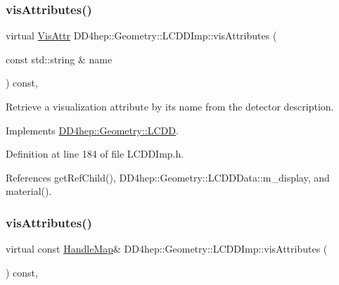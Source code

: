 \subsubsection{\texorpdfstring{vis\+Attributes()}{visAttributes()}\hspace{0.1cm}{\footnotesize\ttfamily [1/2]}}
{\footnotesize\ttfamily virtual \hyperlink{class_d_d4hep_1_1_geometry_1_1_vis_attr}{Vis\+Attr} D\+D4hep\+::\+Geometry\+::\+L\+C\+D\+D\+Imp\+::vis\+Attributes (\begin{DoxyParamCaption}\item[{const std\+::string \&}]{name }\end{DoxyParamCaption}) const\hspace{0.3cm}{\ttfamily [inline]}, {\ttfamily [virtual]}}



Retrieve a visualization attribute by it\textquotesingle{}s name from the detector description. 



Implements \hyperlink{class_d_d4hep_1_1_geometry_1_1_l_c_d_d_a449330acbb5a5d6ba6f1fa2d97cea338}{D\+D4hep\+::\+Geometry\+::\+L\+C\+DD}.



Definition at line 184 of file L\+C\+D\+D\+Imp.\+h.



References get\+Ref\+Child(), D\+D4hep\+::\+Geometry\+::\+L\+C\+D\+D\+Data\+::m\+\_\+display, and material().

\hypertarget{class_d_d4hep_1_1_geometry_1_1_l_c_d_d_imp_a7df9209e12c5e72b432351ee9c9dfcf0}{}\label{class_d_d4hep_1_1_geometry_1_1_l_c_d_d_imp_a7df9209e12c5e72b432351ee9c9dfcf0} 
\subsubsection{\texorpdfstring{vis\+Attributes()}{visAttributes()}\hspace{0.1cm}{\footnotesize\ttfamily [2/2]}}
{\footnotesize\ttfamily virtual const \hyperlink{class_d_d4hep_1_1_geometry_1_1_l_c_d_d_a05cb11e7355772c7b0794bcca59bf477}{Handle\+Map}\& D\+D4hep\+::\+Geometry\+::\+L\+C\+D\+D\+Imp\+::vis\+Attributes (\begin{DoxyParamCaption}{ }\end{DoxyParamCaption}) const\hspace{0.3cm}{\ttfamily [inline]}, {\ttfamily [virtual]}}



